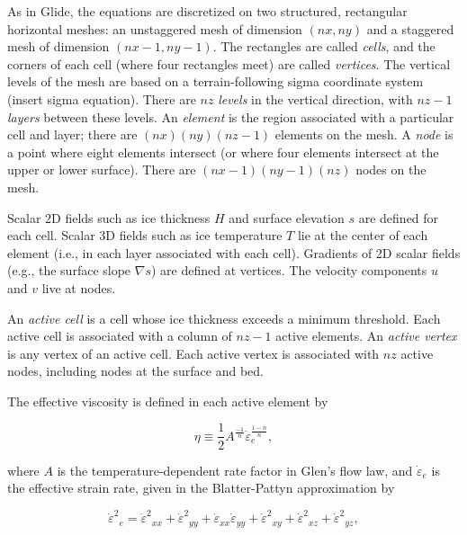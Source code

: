 As in Glide, the equations are discretized on two structured, rectangular horizontal meshes: an unstaggered mesh
of dimension $(nx,ny)$ and a staggered mesh of dimension $(nx-1,ny-1)$.  The rectangles
are called \textit{cells}, and the corners of each cell (where four rectangles meet) are called \textit{vertices}.
The vertical levels of the mesh are based on a terrain-following sigma coordinate system (insert sigma equation).
There are $nz$ \textit{levels} in the vertical direction, with $nz-1$ \textit{layers} between these levels.
An \textit{element} is the region associated with a particular cell and layer; there are
$(nx)(ny)(nz-1)$ elements on the mesh.  A \textit{node} is a point where eight elements intersect (or where four elements
intersect at the upper or lower surface). There are $(nx-1)(ny-1)(nz)$ nodes on the mesh.

Scalar 2D fields such as ice thickness $H$ and surface elevation $s$ are defined for each cell.
Scalar 3D fields such as ice temperature $T$ lie at the center of each element (i.e., in each layer
associated with each cell). Gradients of 2D scalar fields (e.g., the surface slope $\nabla s$) are defined at vertices.
The velocity components $u$ and $v$ live at nodes.

An \textit{active cell} is a cell whose ice thickness exceeds a minimum threshold.  Each active cell is associated with
a column of $nz-1$ active elements.  An \textit{active vertex} is any vertex of an active cell.  Each active vertex is
associated with $nz$ active nodes, including nodes at the surface and bed.

The effective viscosity is defined in each active element by

\begin{equation}
  \label{gliss.eq.effective_viscosity}
  \eta \equiv \frac{1}{2} A^{\frac{-1}{n}} \dot{\varepsilon }_{e}^{\frac{1-n}{n}},
\end{equation}

\noindent
where $A$ is the temperature-dependent rate factor in Glen's flow law, and $\dot{\varepsilon }_{e}$ is the effective strain rate,
given in the Blatter-Pattyn approximation by 

\begin{equation}
  \label{gliss.eq.effective_strain_rate}
        {{\dot{\varepsilon }}^{2}}_{e}={{\dot{\varepsilon }}^{2}}_{xx}+{{\dot{\varepsilon }}^{2}}_{yy}+{{\dot{\varepsilon }}_{xx}}{{\dot{\varepsilon }}_{yy}}+{{\dot{\varepsilon }}^{2}}_{xy}+{{\dot{\varepsilon }}^{2}}_{xz}+{{\dot{\varepsilon }}^{2}}_{yz},
\end{equation}

